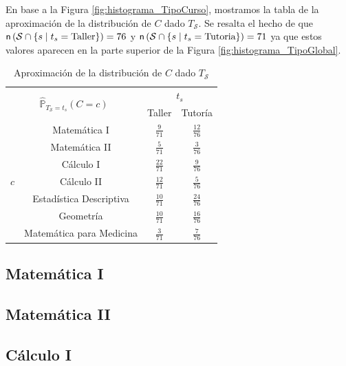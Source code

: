 \documentclass[11pt,a4paper]{book}
\theoremstyle{definition}%
\newcommand{\Probsymb}{\mathds{P}}
\newcommand{\card}[1]{\text{\textsf{n}}\left( #1 \right)}
\begin{document}
            En base a la Figura \ref{fig:histograma_TipoCurso}, mostramos la tabla de la aproximación de la distribución de $C$ dado $T_\mathcal{S}$. Se resalta el hecho de que $\card{\mathcal{S}\cap\{s\mid t_s=\text{Taller}\}}=76$ y $\card{\mathcal{S}\cap\{s\mid t_s=\text{Tutoria}\}}=71$ ya que estos valores aparecen en la parte superior de la Figura \ref{fig:histograma_TipoGlobal}.
            \begin{table}[H]
                \centering
                \begin{tabular}{|c|c|c|c|}
                    \hline
                    \multicolumn{2}{|c|}{\multirow{2}{*}{$\hat{\Probsymb}_{T_\mathcal{S}=t_s}(C=c)$}} & \multicolumn{2}{c|}{$t_s$} \\ \cline{3-4}
                    \multicolumn{2}{|c|}{} & Taller & Tutoría \\ \hline
                    \multirow{7}{*}{$c$} & Matemática I & $\frac{9}{71}$ & $\frac{12}{76}$ \\ \cline{2-4}
                    & Matemática II & $\frac{5}{71}$ & $\frac{3}{76}$  \\ \cline{2-4}
                    & Cálculo I & $\frac{22}{71}$ & $\frac{9}{76}$  \\ \cline{2-4}
                    & Cálculo II & $\frac{12}{71}$ & $\frac{5}{76}$  \\ \cline{2-4}
                    & Estadística Descriptiva & $\frac{10}{71}$ & $\frac{24}{76}$  \\ \cline{2-4}
                    & Geometría & $\frac{10}{71}$ & $\frac{16}{76}$  \\ \cline{2-4}
                    & Matemática para Medicina & $\frac{3}{71}$ & $\frac{7}{76}$  \\ \hline
                \end{tabular}                    
                \caption{Aproximación de la distribución de $C$ dado $T_\mathcal{S}$}
                \label{tab:distribucion_C_Ts}
            \end{table}
            \subsection{Matemática I}
            \subsection{Matemática II}
            \subsection{Cálculo I}
\end{document}
